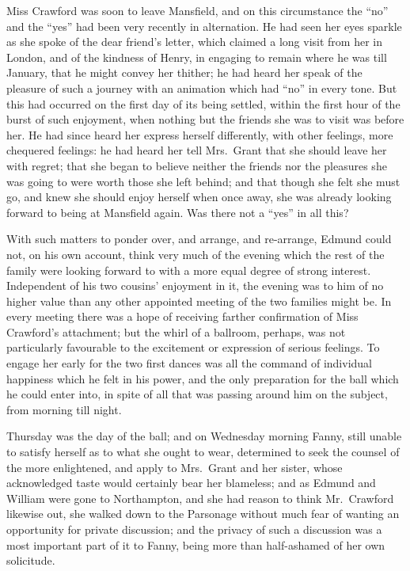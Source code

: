 Miss Crawford was soon to leave Mansfield, and on this
circumstance the ``no'' and the ``yes'' had been very recently
in alternation.  He had seen her eyes sparkle as she spoke
of the dear friend's letter, which claimed a long visit from
her in London, and of the kindness of Henry, in engaging
to remain where he was till January, that he might convey
her thither; he had heard her speak of the pleasure of such
a journey with an animation which had ``no'' in every tone.
But this had occurred on the first day of its being settled,
within the first hour of the burst of such enjoyment,
when nothing but the friends she was to visit was before her.
He had since heard her express herself differently,
with other feelings, more chequered feelings:  he had heard
her tell Mrs.\ Grant that she should leave her with regret;
that she began to believe neither the friends nor
the pleasures she was going to were worth those she
left behind; and that though she felt she must go,
and knew she should enjoy herself when once away, she was
already looking forward to being at Mansfield again.
Was there not a ``yes'' in all this?

With such matters to ponder over, and arrange, and re-arrange,
Edmund could not, on his own account, think very much
of the evening which the rest of the family were looking
forward to with a more equal degree of strong interest.
Independent of his two cousins' enjoyment in it,
the evening was to him of no higher value than any
other appointed meeting of the two families might be.
In every meeting there was a hope of receiving farther
confirmation of Miss Crawford's attachment; but the whirl
of a ballroom, perhaps, was not particularly favourable
to the excitement or expression of serious feelings.
To engage her early for the two first dances was all the
command of individual happiness which he felt in his power,
and the only preparation for the ball which he could
enter into, in spite of all that was passing around him
on the subject, from morning till night.

Thursday was the day of the ball; and on Wednesday
morning Fanny, still unable to satisfy herself as to what
she ought to wear, determined to seek the counsel of the
more enlightened, and apply to Mrs.\ Grant and her sister,
whose acknowledged taste would certainly bear her blameless;
and as Edmund and William were gone to Northampton,
and she had reason to think Mr.\ Crawford likewise out,
she walked down to the Parsonage without much fear of wanting
an opportunity for private discussion; and the privacy of
such a discussion was a most important part of it to Fanny,
being more than half-ashamed of her own solicitude.

